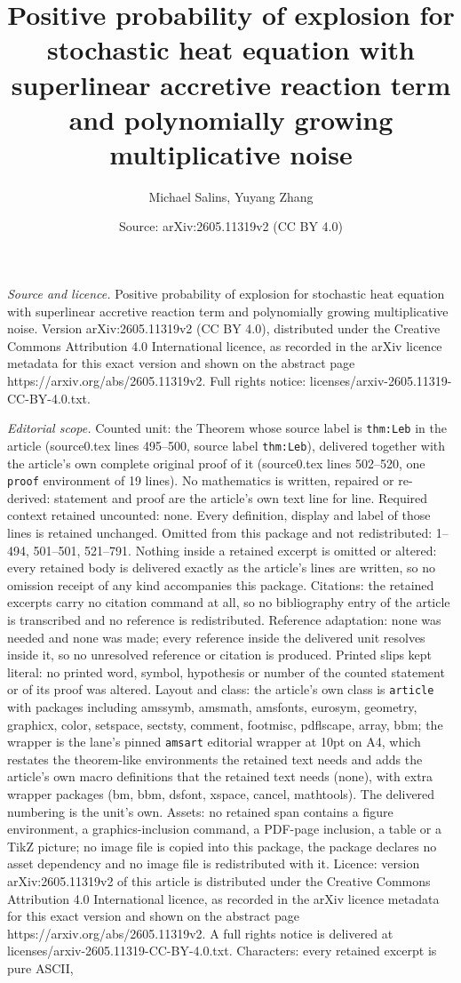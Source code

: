 \documentclass[10pt,a4paper]{amsart}
\title[Positive probability of explosion for stochastic heat equati]{Positive probability of explosion for stochastic heat equation with superlinear accretive reaction term and polynomially growing multiplicative noise}
\author{Michael Salins, Yuyang Zhang}
\date{Source: arXiv:2605.11319v2 (CC BY 4.0)}
\begin{document}
\maketitle

\noindent\emph{Source and licence.} Positive probability of explosion for stochastic heat equation with superlinear accretive reaction term and polynomially growing multiplicative noise. Version arXiv:2605.11319v2 (CC BY 4.0), distributed under the Creative Commons Attribution 4.0 International licence, as recorded in the arXiv licence metadata for this exact version and shown on the abstract page https://arxiv.org/abs/2605.11319v2. Full rights notice: licenses/arxiv-2605.11319-CC-BY-4.0.txt.\par\smallskip

\noindent\textit{Editorial scope.} Counted unit: the Theorem whose source label is \texttt{thm:Leb} in the article (source0.tex lines 495--500, source label \texttt{thm:Leb}), delivered together with the article's own complete original proof of it (source0.tex lines 502--520, one \texttt{proof} environment of 19 lines). No mathematics is written, repaired or re-derived: statement and proof are the article's own text line for line. Required context retained uncounted: none. Every definition, display and label of those lines is retained unchanged. Omitted from this package and not redistributed: 1--494, 501--501, 521--791. Nothing inside a retained excerpt is omitted or altered: every retained body is delivered exactly as the article's lines are written, so no omission receipt of any kind accompanies this package. Citations: the retained excerpts carry no citation command at all, so no bibliography entry of the article is transcribed and no reference is redistributed. Reference adaptation: none was needed and none was made; every reference inside the delivered unit resolves inside it, so no unresolved reference or citation is produced. Printed slips kept literal: no printed word, symbol, hypothesis or number of the counted statement or of its proof was altered. Layout and class: the article's own class is \texttt{article} with packages including amssymb, amsmath, amsfonts, eurosym, geometry, graphicx, color, setspace, sectsty, comment, footmisc, pdflscape, array, bbm; the wrapper is the lane's pinned \texttt{amsart} editorial wrapper at 10pt on A4, which restates the theorem-like environments the retained text needs and adds the article's own macro definitions that the retained text needs (none), with extra wrapper packages (bm, bbm, dsfont, xspace, cancel, mathtools). The delivered numbering is the unit's own. Assets: no retained span contains a figure environment, a graphics-inclusion command, a PDF-page inclusion, a table or a TikZ picture; no image file is copied into this package, the package declares no asset dependency and no image file is redistributed with it. Licence: version arXiv:2605.11319v2 of this article is distributed under the Creative Commons Attribution 4.0 International licence, as recorded in the arXiv licence metadata for this exact version and shown on the abstract page https://arxiv.org/abs/2605.11319v2. A full rights notice is delivered at licenses/arxiv-2605.11319-CC-BY-4.0.txt. Characters: every retained excerpt is pure ASCII, 
\end{document}
